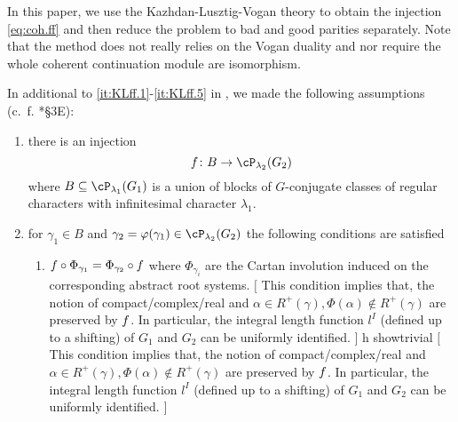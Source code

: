 \documentclass[12pt,a4paper]{amsart}
\newcommand{\trivial}[2][]{\if\relax\detokenize{#1}\relax
  {%
      \color{orange} \vspace{0em} $[$  #2 $]$
      \color{black}
  }
  \else
\ifx#1h
\ifcsname showtrivial\endcsname
{%
    \color{orange} \vspace{0em}  $[$ #2 $]$
    \color{black}
}
\fi
\else {\red Wrong argument!} \fi
\fi
}
\numberwithin{equation}{section}
\theoremstyle{remark}
\begin{document}
In this paper, we use the Kazhdan-Lusztig-Vogan theory to obtain the injection
\eqref{eq:coh.ff} and then reduce the problem to bad and good parities
separately.
Note that the method does not really relies on the Vogan duality and nor
require the whole coherent continuation module are isomorphism.

In additional to \ref{it:KLff.1}-\ref{it:KLff.5} in
, we made the following assumptions (c.~f. \cite{GI}*{\S 3E}):
\begin{enumerate}[KLff]
  \item there is an injection
        \[
        \ff \colon B\rightarrow \cP_{\lambda_{2}}(G_{2})
        \]
        where $B\subseteq \cP_{\lambda_{1}}(G_{1})$ is a union of blocks of
        $G$-conjugate classes of regular characters with infinitesimal character
        $\lambda_{1}$.
  \item for $\gamma_{1}\in B$ and $\gamma_{2} = \ffcoh(\gamma_{1})\in \cP_{\lambda_{2}}(G_{2})$ the
        following conditions are satisfied
        \begin{enumerate}[label=(\alph*)]
          \item $f \circ \Phi_{\gamma_{1}} = \Phi_{\gamma_{2}}\circ f$
                where $\Phi_{\gamma_{i}}$ are the Cartan involution induced on
                the corresponding abstract root systems. \trivial[]{ This
                condition implies that, the notion of compact/complex/real and
                $\alpha\in R^{+}(\gamma), \Phi(\alpha)\notin R^{+}(\gamma)$
                are preserved by $f$. In particular, the integral length
                function $l^{I}$ (defined up to a shifting) of $G_{1}$ and
                $G_{2}$ can be uniformly identified. }

\end{enumerate}
\end{enumerate}
\end{document}
